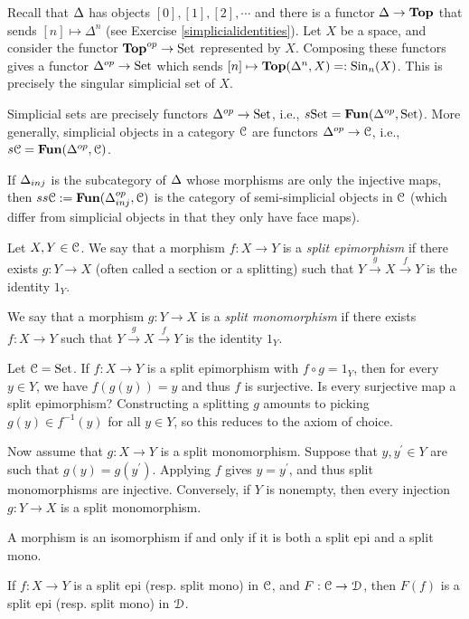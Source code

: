 Recall that ${\Delta}$ has objects $[0],[1],[2],\cdots$ and there is a functor ${\Delta}\to\mathbf{Top}$ that sends $[n]\mapsto\Delta^n$ (see Exercise \ref{simplicialidentities}). Let $X$ be a space, and consider the functor $\mathbf{Top}^{op}\to{\mathrm{Set}}$ represented by $X$. Composing these functors gives a functor $\Delta^{op}\to{\mathrm{Set}}$ which sends $[n]\mapsto\mathbf{Top}(\Delta^n,X)=:\mathrm{Sin}_n(X)$. This is precisely the singular simplicial set of $X$.
\begin{prop}
Simplicial sets are precisely functors ${\Delta}^{op}\to{\mathrm{Set}}$, i.e., $s{\mathrm{Set}}=\mathbf{Fun}({\Delta}^{op},{\mathrm{Set}})$. More generally, simplicial objects in a category $\mathcal C$ are functors ${\Delta}^{op}\to\mathcal C$, i.e., $s\mathcal C=\mathbf{Fun}({\Delta}^{op},\mathcal C)$.
\end{prop}
If ${\Delta}_{inj}$ is the subcategory of ${\Delta}$ whose morphisms are only the injective maps, then $ss\mathcal C:=\mathbf{Fun}({\Delta}^{op}_{inj},\mathcal C)$ is the category of semi-simplicial objects in $\mathcal C$ (which differ from simplicial objects in that they only have face maps).
\begin{definition}
Let $X,Y\in \mathcal C$. We say that a morphism $f\colon X\rightarrow Y$ is a \emph{split epimorphism} if there exists $g:Y\to X$ (often called a section or a splitting) such that $Y\xrightarrow{g}X\xrightarrow{f}Y$ is the identity $1_Y$.

We say that a morphism $g\colon Y\rightarrow X$ is a \emph{split monomorphism} if there exists $f\colon X\to Y$ such that $Y\xrightarrow{g}X\xrightarrow{f}Y$ is the identity $1_Y$.
\end{definition}
\begin{example}
Let $\mathcal C={\mathrm{Set}}$. If $f:X\to Y$ is a split epimorphism with $f\circ g = 1_Y$, then for every $y\in Y$, we have $f(g(y))=y$ and thus $f$ is surjective. Is every surjective map a split epimorphism? Constructing a splitting $g$ amounts to picking $g(y)\in f^{-1}(y)$ for all $y\in Y$, so this reduces to the axiom of choice.

Now assume that $g: X\to Y$ is a split monomorphism. Suppose that $y,y^\prime\in Y$ are such that $g(y)=g(y^\prime)$. Applying $f$ gives $y=y^\prime$, and thus split monomorphisms are injective. Conversely, if $Y$ is nonempty, then every injection $g:Y\to X$ is a split monomorphism.
\end{example}
\begin{example}
A morphism is an isomorphism if and only if it is both a split epi and a split mono.
\end{example}
\begin{lemma}
If $f:X\to Y$ is a split epi (resp. split mono) in $\mathcal C$, and $F:\mathcal C\to \mathcal D$, then $F(f)$ is a split epi (resp. split mono) in $\mathcal D$.
\end{lemma}

